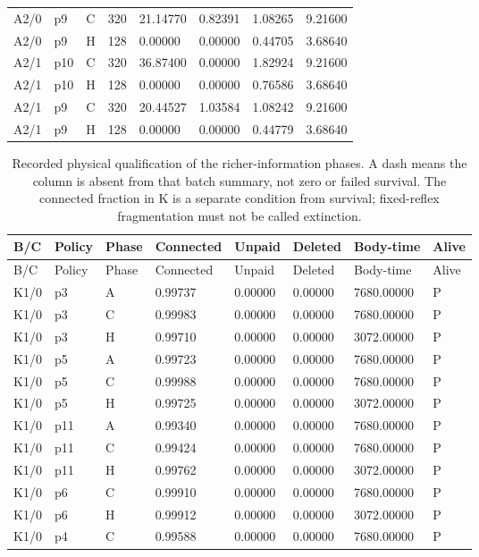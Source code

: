 \begin{longtable}{llllllll}
A2/0 & p9 & C & 320 & 21.14770 & 0.82391 & 1.08265 & 9.21600 \\
A2/0 & p9 & H & 128 & 0.00000 & 0.00000 & 0.44705 & 3.68640 \\
A2/1 & p10 & C & 320 & 36.87400 & 0.00000 & 1.82924 & 9.21600 \\
A2/1 & p10 & H & 128 & 0.00000 & 0.00000 & 0.76586 & 3.68640 \\
A2/1 & p9 & C & 320 & 20.44527 & 1.03584 & 1.08242 & 9.21600 \\
A2/1 & p9 & H & 128 & 0.00000 & 0.00000 & 0.44779 & 3.68640 \\
\bottomrule
\end{longtable}
\begin{longtable}{llllllll}
\caption{Recorded physical qualification of the richer-information phases. A dash means the column is absent from that batch summary, not zero or failed survival. The connected fraction in K is a separate condition from survival; fixed-reflex fragmentation must not be called extinction.}\label{tab:rich-action-physical}\\
\toprule
B/C & Policy & Phase & Connected & Unpaid & Deleted & Body-time & Alive \\
\midrule
\endfirsthead
\toprule
B/C & Policy & Phase & Connected & Unpaid & Deleted & Body-time & Alive \\
\midrule
\endhead
K1/0 & p3 & A & 0.99737 & 0.00000 & 0.00000 & 7680.00000 & P \\
K1/0 & p3 & C & 0.99983 & 0.00000 & 0.00000 & 7680.00000 & P \\
K1/0 & p3 & H & 0.99710 & 0.00000 & 0.00000 & 3072.00000 & P \\
K1/0 & p5 & A & 0.99723 & 0.00000 & 0.00000 & 7680.00000 & P \\
K1/0 & p5 & C & 0.99988 & 0.00000 & 0.00000 & 7680.00000 & P \\
K1/0 & p5 & H & 0.99725 & 0.00000 & 0.00000 & 3072.00000 & P \\
K1/0 & p11 & A & 0.99340 & 0.00000 & 0.00000 & 7680.00000 & P \\
K1/0 & p11 & C & 0.99424 & 0.00000 & 0.00000 & 7680.00000 & P \\
K1/0 & p11 & H & 0.99762 & 0.00000 & 0.00000 & 3072.00000 & P \\
K1/0 & p6 & C & 0.99910 & 0.00000 & 0.00000 & 7680.00000 & P \\
K1/0 & p6 & H & 0.99912 & 0.00000 & 0.00000 & 3072.00000 & P \\
K1/0 & p4 & C & 0.99588 & 0.00000 & 0.00000 & 7680.00000 & P \\

\end{longtable}
